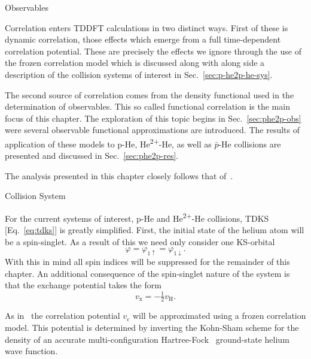 \documentclass[letterpaper, 11 pt]{report}
\begin{document}
\begin{chapter}{Observables \label{chap:p-he2p-he}} %

   Correlation enters TDDFT calculations in two distinct ways. First of these is dynamic
   correlation, those effects which emerge from a full time-dependent correlation potential. These are
   precisely the effects we ignore through the use of the frozen correlation model which is discussed
   along with along side a description of the collision systems of interest in 
   Sec.~\ref{sec:p-he2p-he-sys}.

   The second source of correlation comes from the density functional
   used in the determination of observables. This so called functional correlation is the main focus of
   this chapter. The exploration of this topic begins in Sec.~\ref{sec:phe2p-obs} were several
   observable functional approximations are introduced. The results of application of these models to
   p-He, He\textsuperscript{2+}-He, as well as $\bar{p}$-He collisions are presented and discussed in
   Sec.~\ref{sec:phe2p-res}.

   The analysis presented in this chapter closely follows that of~\cite{p-he2p-he}.

   \begin{section}{Collision System \label{sec:p-he2p-he-sys}}

      For the current systems of interest, p-He and He\textsuperscript{2+}-He collisions, TDKS
      [Eq.~\eqref{eq:tdks}] is greatly simplified. First, the initial state of the helium atom will be a
      spin-singlet. As a result of this we need only consider one KS-orbital
      \begin{equation} \label{eq:oneorb}
         \varphi = \varphi_{1\uparrow} = \varphi_{1\downarrow}.
      \end{equation}
      With this in mind all spin indices will be suppressed for the remainder of this chapter. An
      additional consequence of the spin-singlet nature of the system is that the exchange potential
      takes the form
      \begin{equation} \label{eq:vxvh}
         v_\mathrm{x} = - \tfrac{1}{2} v_\mathrm{H}.
      \end{equation}

      As in~\cite{pbarhe} the correlation potential $v_\mathrm{c}$ will be approximated using a frozen
      correlation model. This potential is determined by inverting the Kohn-Sham scheme for the density
      of an accurate multi-configuration Hartree-Fock~\cite{mchf} ground-state helium wave function.


\end{section}
\end{chapter}
\end{document}
